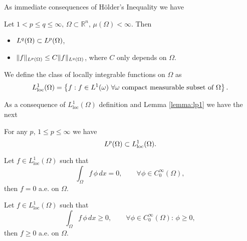 As immediate consequences of H\"older's Inequality we have
\begin{lemma}\label{lemma:lp1}
Let $1<p\leq q\leq \infty,\,\Omega\subset \mathbb{R}^n,\,\mu(\Omega)<\infty$. Then
\begin{itemize}
\item ${L^{q}(\Omega)}\subset {L^{p}(\Omega)}$,
\item $\|f\|_{L^{p}(\Omega)}\leq C \|f\|_{L^{q}(\Omega)}$, where $C$ only depends on $\Omega$.
\end{itemize}
\end{lemma}
\begin{definition} We define the class of locally integrable functions on $\Omega$ as $$L_\text{loc}^1(\Omega)=\left\{f:f\in {L^{1}(\omega)}\,\, \forall \omega \text{ compact measurable subset of }\Omega\right\}.$$
\end{definition}
As a consequence of $L_\text{loc}^1(\Omega)$ definition and Lemma \ref{lemma:lp1} we have the next
\begin{lemma} For any $p$, $1\leq p \leq \infty$ we have $${L^{p}(\Omega)} \subset L^1_\text{loc}(\Omega).$$
\end{lemma}
\begin{lemma}\label{lemma:L1loc}Let $f\in L^1_\text{loc}(\Omega)$ such that $$\int_\Omega f\,\phi\,dx = 0,\qquad \forall \phi\in C_0^\infty(\Omega),$$
then $f=0$ a.e. on $\Omega$.
\end{lemma}

\begin{lemma}\label{lemma:L1loc_in}Let $f\in L^1_\text{loc}(\Omega)$ such that $$\int_\Omega f\,\phi\,dx \geq 0,\qquad \forall \phi\in C_0^\infty(\Omega):\,\phi\geq 0,$$
then $f\geq 0$ a.e. on $\Omega$.
\end{lemma}

